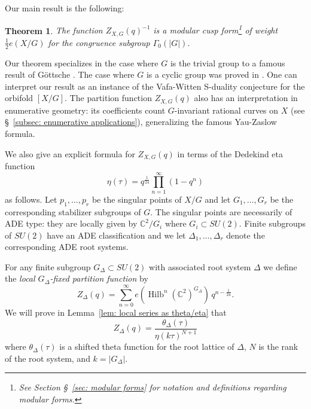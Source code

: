 \documentclass{article}
\newtheorem{theorem}{Theorem}[section]
\theoremstyle{definition}
\newcommand{\half}{\frac{1}{2}}
\newcommand{\CC} {{\mathbb C}}          %
\newcommand{\Hilb}{\operatorname{Hilb}}
\begin{document}
Our main result is the following:

\begin{theorem}
\label{thm:main}
The function $Z_{X,G}(q)^{-1}$ is a modular cusp form\footnote{See
Section \S~\ref{sec: modular forms}  for notation and definitions regarding modular
forms.} of weight $\half e(X/G)$ for the congruence subgroup
$\Gamma_{0}(|G|)$.
\end{theorem}
   

Our theorem specializes in the case where $G$ is the trivial group to
a famous result of G\"ottsche \cite{gottsche1990betti}. The case where
$G$ is a cyclic group was proved in \cite{bryan2018chl}. One can
interpret our result as an instance of the Vafa-Witten S-duality
conjecture for the orbifold $[X/G]$. The partition function
$Z_{X,G}(q)$ also has an interpretation in enumerative geometry: its coefficients count $G$-invariant rational curves on
$X$ (see \S~\ref{subsec: enumerative applications}), generalizing the
famous Yau-Zaslow formula.

We also give an explicit formula for $Z_{X,G}(q)$ in terms of the
Dedekind eta function
\[
\eta (\tau ) = q^{\frac{1}{24}}\prod_{n=1}^{\infty} (1-q^{n})
\]
as follows. Let $p_{1},\dots ,p_{r}$ be the singular points of $X/G$
and let $G_{1},\dots ,G_{r}$ be the corresponding stabilizer subgroups
of $G$. The singular points are necessarily of ADE type: they are
locally given by $\CC^{2}/G_{i}$ where $G_{i}\subset SU(2)$. Finite
subgroups of $SU(2)$ have an ADE classification and we let
$\Delta_{1},\dots ,\Delta_{r}$ denote the corresponding ADE root
systems.

For any finite subgroup $G_{\Delta}\subset SU(2)$ with associated root
system $\Delta$ we define the \emph{local $G_{\Delta }$-fixed
partition function} by
\[
Z_{\Delta} (q) = \sum_{n=0}^{\infty}
e\left(\Hilb^{n}(\CC^{2})^{G_{\Delta}} \right) \, q^{n-\frac{1}{24}} .
\]
We will prove in Lemma~\ref{lem: local series as theta/eta}  that
\[
Z_{\Delta}(q) =\frac{\theta_{\Delta}(\tau)}{\eta (k\tau )^{N+1}}
\]
where $\theta_{\Delta}(\tau )$ is a shifted theta function for the
root lattice of $\Delta$, $N$ is the rank of the root system, and
$k=|G_{\Delta}|$.
\end{document}
